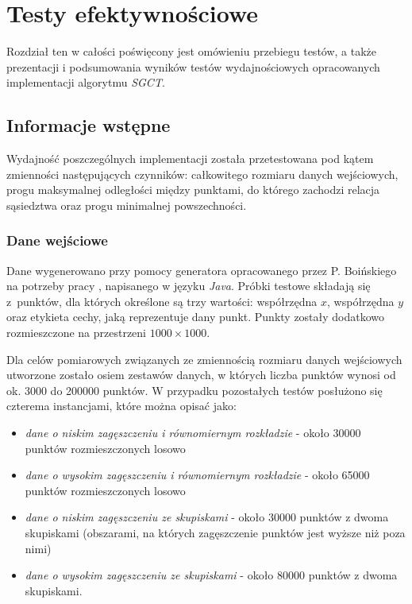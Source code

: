 \documentclass[12pt]{article}
\begin{document}
\newpage

\section{Testy efektywnościowe}
\label{sec:tests}

Rozdział ten w całości poświęcony jest omówieniu przebiegu testów, a także prezentacji i podsumowania wyników testów wydajnościowych opracowanych implementacji algorytmu \textit{SGCT}. 

\subsection{Informacje wstępne}

Wydajność poszczególnych implementacji została przetestowana pod kątem zmienności następujących czynników: całkowitego rozmiaru danych wejściowych, progu maksymalnej odległości między punktami, do którego zachodzi relacja sąsiedztwa oraz progu minimalnej powszechności.

\subsubsection{Dane wejściowe}

Dane wygenerowano przy pomocy generatora opracowanego przez P. Boińskiego na potrzeby pracy \cite{boinski}, napisanego w języku \textit{Java}. Próbki testowe składają się z~punktów, dla których określone są trzy wartości: współrzędna $ x $, współrzędna $ y $ oraz etykieta cechy, jaką reprezentuje dany punkt. Punkty zostały dodatkowo rozmieszczone na przestrzeni $ 1000 \times 1000$. 

Dla celów pomiarowych związanych ze zmiennością rozmiaru danych wejściowych utworzone zostało osiem zestawów danych, w których liczba punktów wynosi od ok. 3000 do 200000 punktów. W przypadku pozostałych testów posłużono się czterema instancjami, które można opisać jako:

\begin{itemize}
\item \textit{dane o niskim zagęszczeniu i równomiernym rozkładzie} - około 30000 punktów rozmieszczonych losowo
\item \textit{dane o wysokim zagęszczeniu i równomiernym rozkładzie} - około 65000 punktów rozmieszczonych losowo
\item \textit{dane o niskim zagęszczeniu ze skupiskami} - około 30000 punktów z dwoma skupiskami (obszarami, na których zagęszczenie punktów jest wyższe niż poza nimi)
\item \textit{dane o wysokim zagęszczeniu ze skupiskami} - około 80000 punktów z dwoma skupiskami.
\end{itemize}
\end{document}
